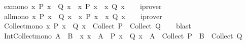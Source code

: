 \begin{isabellebody}
\isanewline
{}\isamarkupfalse%
\ ex{\isacharunderscore}{\kern0pt}mono{\isacharcolon}{\kern0pt}\ {\isachardoublequoteopen}{\isacharparenleft}{\kern0pt}{\isasymAnd}x{\isachardot}{\kern0pt}\ P\ x\ {\isasymlongrightarrow}\ Q\ x{\isacharparenright}{\kern0pt}\ {\isasymLongrightarrow}\ {\isacharparenleft}{\kern0pt}{\isasymexists}x{\isachardot}{\kern0pt}\ P\ x{\isacharparenright}{\kern0pt}\ {\isasymlongrightarrow}\ {\isacharparenleft}{\kern0pt}{\isasymexists}x{\isachardot}{\kern0pt}\ Q\ x{\isacharparenright}{\kern0pt}{\isachardoublequoteclose}\isanewline
%
\isadelimproof
\ \ %
\endisadelimproof
%
\isatagproof
{}\isamarkupfalse%
\ iprover%
\endisatagproof
{\isafoldproof}%
%
\isadelimproof
\isanewline
%
\endisadelimproof
\isanewline
{}\isamarkupfalse%
\ all{\isacharunderscore}{\kern0pt}mono{\isacharcolon}{\kern0pt}\ {\isachardoublequoteopen}{\isacharparenleft}{\kern0pt}{\isasymAnd}x{\isachardot}{\kern0pt}\ P\ x\ {\isasymlongrightarrow}\ Q\ x{\isacharparenright}{\kern0pt}\ {\isasymLongrightarrow}\ {\isacharparenleft}{\kern0pt}{\isasymforall}x{\isachardot}{\kern0pt}\ P\ x{\isacharparenright}{\kern0pt}\ {\isasymlongrightarrow}\ {\isacharparenleft}{\kern0pt}{\isasymforall}x{\isachardot}{\kern0pt}\ Q\ x{\isacharparenright}{\kern0pt}{\isachardoublequoteclose}\isanewline
%
\isadelimproof
\ \ %
\endisadelimproof
%
\isatagproof
{}\isamarkupfalse%
\ iprover%
\endisatagproof
{\isafoldproof}%
%
\isadelimproof
\isanewline
%
\endisadelimproof
\isanewline
{}\isamarkupfalse%
\ Collect{\isacharunderscore}{\kern0pt}mono{\isacharcolon}{\kern0pt}\ {\isachardoublequoteopen}{\isacharparenleft}{\kern0pt}{\isasymAnd}x{\isachardot}{\kern0pt}\ P\ x\ {\isasymlongrightarrow}\ Q\ x{\isacharparenright}{\kern0pt}\ {\isasymLongrightarrow}\ Collect\ P\ {\isasymsubseteq}\ Collect\ Q{\isachardoublequoteclose}\isanewline
%
\isadelimproof
\ \ %
\endisadelimproof
%
\isatagproof
{}\isamarkupfalse%
\ blast%
\endisatagproof
{\isafoldproof}%
%
\isadelimproof
\isanewline
%
\endisadelimproof
\isanewline
{}\isamarkupfalse%
\ Int{\isacharunderscore}{\kern0pt}Collect{\isacharunderscore}{\kern0pt}mono{\isacharcolon}{\kern0pt}\ {\isachardoublequoteopen}A\ {\isasymsubseteq}\ B\ {\isasymLongrightarrow}\ {\isacharparenleft}{\kern0pt}{\isasymAnd}x{\isachardot}{\kern0pt}\ x\ {\isasymin}\ A\ {\isasymLongrightarrow}\ P\ x\ {\isasymlongrightarrow}\ Q\ x{\isacharparenright}{\kern0pt}\ {\isasymLongrightarrow}\ A\ {\isasyminter}\ Collect\ P\ {\isasymsubseteq}\ B\ {\isasyminter}\ Collect\ Q{\isachardoublequoteclose}\isanewline

\end{isabellebody}
